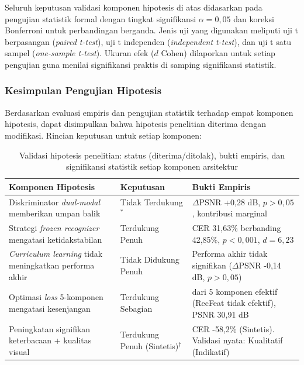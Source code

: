 Seluruh keputusan validasi komponen hipotesis di atas didasarkan pada pengujian statistik formal dengan tingkat signifikansi $\alpha = 0,05$ dan koreksi Bonferroni untuk perbandingan berganda. Jenis uji yang digunakan meliputi uji t berpasangan (\textit{paired t-test}), uji t independen (\textit{independent t-test}), dan uji t satu sampel (\textit{one-sample t-test}). Ukuran efek ($d$ Cohen) dilaporkan untuk setiap pengujian guna menilai signifikansi praktis di samping signifikansi statistik.


\subsubsection{Kesimpulan Pengujian Hipotesis}
\label{subsubsec:kesimpulan-hipotesis}

Berdasarkan evaluasi empiris dan pengujian statistik terhadap empat komponen hipotesis, dapat disimpulkan bahwa hipotesis penelitian diterima dengan modifikasi. Rincian keputusan untuk setiap komponen:

\begin{table}[!htbp]
    \caption[Evaluasi hipotesis penelitian]{Validasi hipotesis penelitian: status (diterima/ditolak), bukti empiris, dan signifikansi statistik setiap komponen arsitektur}
    \label{tab:ringkasan-hipotesis}
    \begin{tabularx}{\textwidth}{|>{\raggedright\arraybackslash}X|>{\raggedright\arraybackslash}p{3cm}|>{\raggedright\arraybackslash}X|}
        \hline
        \textbf{Komponen Hipotesis}                                             & \textbf{Keputusan}                              & \textbf{Bukti Empiris}                                                     \\
        \hline
        Diskriminator \textit{dual-modal} memberikan umpan balik                & Tidak Terdukung$^*$                    & $\Delta$PSNR +0,28 dB, $p>0,05$, kontribusi marginal              \\
        \hline
        Strategi \textit{frozen recognizer} mengatasi ketidakstabilan  & Terdukung Penuh                        & CER 31,63\% berbanding 42,85\%, $p<0,001$, $d=6,23$                       \\
        \hline
        \textit{Curriculum learning} tidak meningkatkan performa akhir & Tidak Didukung Penuh                   & Performa akhir tidak signifikan ($\Delta$PSNR -0,14 dB, $p>0,05$) \\
        \hline
        Optimasi \textit{loss} 5-komponen mengatasi kesenjangan        & Terdukung Sebagian                     & 4 dari 5 komponen efektif (RecFeat tidak efektif), PSNR 30,91 dB  \\
        \hline
        Peningkatan signifikan keterbacaan + kualitas visual           & Terdukung Penuh (Sintetis)$^{\dagger}$ & CER -58,2\% (Sintetis). Validasi nyata: Kualitatif (Indikatif)    \\
        \hline
    \end{tabularx}
\end{table}


